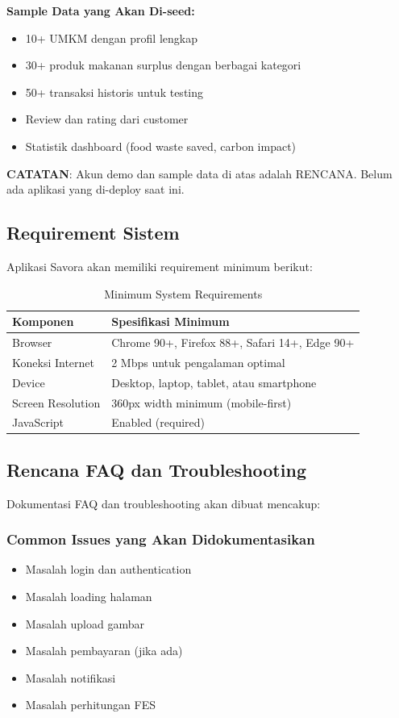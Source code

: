 \textbf{Sample Data yang Akan Di-seed:}
\begin{itemize}[leftmargin=*]
    \item 10+ UMKM dengan profil lengkap
    \item 30+ produk makanan surplus dengan berbagai kategori
    \item 50+ transaksi historis untuk testing
    \item Review dan rating dari customer
    \item Statistik dashboard (food waste saved, carbon impact)
\end{itemize}

\textbf{CATATAN}: Akun demo dan sample data di atas adalah RENCANA. Belum ada aplikasi yang di-deploy saat ini.

\subsection{Requirement Sistem}

Aplikasi Savora akan memiliki requirement minimum berikut:

\begin{table}[H]
\centering
\caption{Minimum System Requirements}
\label{tab:requirements}
\begin{tabularx}{\textwidth}{|l|X|}
\hline
\textbf{Komponen} & \textbf{Spesifikasi Minimum} \\
\hline
Browser & Chrome 90+, Firefox 88+, Safari 14+, Edge 90+ \\
\hline
Koneksi Internet & 2 Mbps untuk pengalaman optimal \\
\hline
Device & Desktop, laptop, tablet, atau smartphone \\
\hline
Screen Resolution & 360px width minimum (mobile-first) \\
\hline
JavaScript & Enabled (required) \\
\hline
\end{tabularx}
\end{table}

\subsection{Rencana FAQ dan Troubleshooting}

Dokumentasi FAQ dan troubleshooting akan dibuat mencakup:

\subsubsection{Common Issues yang Akan Didokumentasikan}
\begin{itemize}[leftmargin=*]
    \item Masalah login dan authentication
    \item Masalah loading halaman
    \item Masalah upload gambar
    \item Masalah pembayaran (jika ada)
    \item Masalah notifikasi
    \item Masalah perhitungan FES
\end{itemize}

